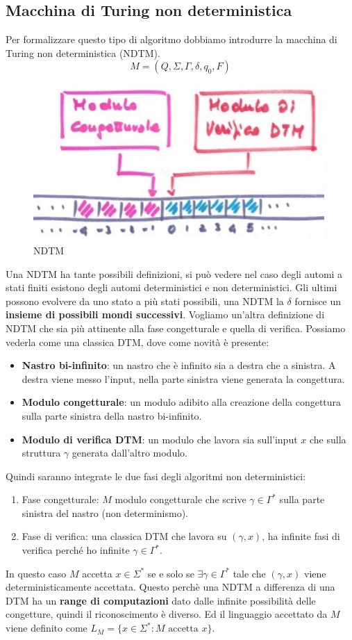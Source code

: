 \documentclass{article}
\begin{document}
\subsection{Macchina di Turing non deterministica}
Per formalizzare questo tipo di algoritmo dobbiamo introdurre la macchina di Turing
non deterministica (NDTM).
$$M=(Q,\Sigma,\Gamma,\delta,q_0,F)$$
\begin{figure}[H]
    \centering
    \includegraphics[scale=0.6]{images/ndtm.png}
    \caption{NDTM}
\end{figure}
Una NDTM ha tante possibili definizioni, si può vedere nel caso degli automi a stati finiti
esistono degli automi deterministici e non deterministici. Gli ultimi possono evolvere da uno
stato a più stati possibili, una NDTM la $\delta$ fornisce un \textbf{insieme di possibili mondi
successivi}. Vogliamo un'altra definizione di NDTM che sia più attinente alla fase
congetturale e quella di verifica.
Possiamo vederla come una classica DTM, dove come novità è presente:
\begin{itemize}
    \item \textbf{Nastro bi-infinito}: un nastro che è infinito sia a destra
          che a sinistra. A destra viene messo l'input, nella parte sinistra viene
          generata la congettura.
    \item \textbf{Modulo congetturale}: un modulo adibito alla creazione
          della congettura sulla parte sinistra della nastro bi-infinito.
    \item \textbf{Modulo di verifica DTM}: un modulo che lavora sia sull'input $x$
          che sulla struttura $\gamma$ generata dall'altro modulo.
\end{itemize}
Quindi saranno integrate le due fasi degli algoritmi non deterministici:
\begin{enumerate}
    \item Fase congetturale: $M$ modulo congetturale che scrive $\gamma\in\Gamma^*$ sulla
          parte sinistra del nastro (non determinismo).
    \item Fase di verifica: una classica DTM che lavora su $(\gamma,x)$, ha infinite
          fasi di verifica perché ho infinite $\gamma\in\Gamma^*$.
\end{enumerate}
In questo caso $M$ accetta $x\in\Sigma^*$ se e solo se $\exists\gamma\in\Gamma^*$ tale
che $(\gamma,x)$ viene deterministicamente accettata.
Questo perchè una NDTM a differenza di una DTM ha un \textbf{range di computazioni}
dato dalle infinite possibilità delle congetture, quindi il riconoscimento è diverso.
Ed il linguaggio accettato da $M$ viene definito come $L_M=\{x\in\Sigma^*:M\text{ accetta }x\}$.
\end{document}
